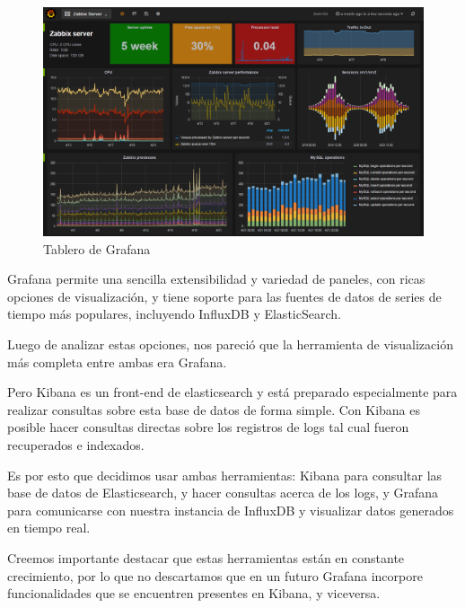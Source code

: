\begin{figure}
  \includegraphics[width=\linewidth]{src/images/05-capitulo-5/grafana.png}
  \caption{Tablero de Grafana}
  \label{fig:grafana}
\end{figure}

Grafana permite una sencilla extensibilidad y variedad de paneles, con ricas opciones de visualización, y tiene soporte para las fuentes de datos de series de tiempo más populares, incluyendo InfluxDB y ElasticSearch.

Luego de analizar estas opciones, nos pareció que la herramienta de visualización más completa entre ambas era Grafana.

Pero Kibana es un front-end de elasticsearch y está preparado especialmente para realizar consultas sobre esta base de datos de forma simple. Con Kibana es posible hacer consultas directas sobre los registros de logs tal cual fueron recuperados e indexados.

Es por esto que decidimos usar ambas herramientas: Kibana para consultar las base de datos de Elasticsearch, y hacer consultas acerca de los logs, y Grafana para comunicarse con nuestra instancia de InfluxDB y visualizar datos generados en tiempo real.

Creemos importante destacar que estas herramientas están en constante crecimiento, por lo que no descartamos que en un futuro Grafana incorpore funcionalidades que se encuentren presentes en Kibana, y viceversa.
